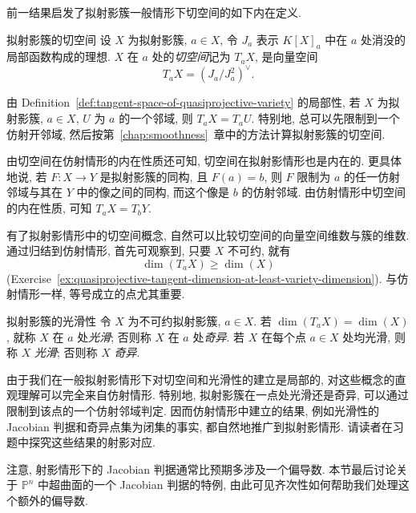 前一结果启发了拟射影簇一般情形下切空间的如下内在定义.

\begin{Definition}{拟射影簇的切空间}\leavevmode\label{def:tangent-space-of-quasiprojective-variety}
设 $X$ 为拟射影簇, $a\in X$, 令 $J_{a}$ 表示 $K[X]_{a}$ 中在 $a$ 处消没的局部函数构成的理想. $X$ 在 $a$ 处的\emph{切空间}记为 $T_{a}X$, 是向量空间
\[
  T_{a}X=(J_{a}/J_{a}^{2})^{\vee}.
\]
\end{Definition}

由 Definition~\ref{def:tangent-space-of-quasiprojective-variety} 的局部性, 若 $X$ 为拟射影簇, $a\in X$, $U$ 为 $a$ 的一个邻域, 则 $T_{a}X=T_{a}U$. 特别地, 总可以先限制到一个仿射开邻域, 然后按第~\ref{chap:smoothness}~章中的方法计算拟射影簇的切空间.

由切空间在仿射情形的内在性质还可知, 切空间在拟射影情形也是内在的. 更具体地说, 若 $F:X\to Y$ 是拟射影簇的同构, 且 $F(a)=b$, 则 $F$ 限制为 $a$ 的任一仿射邻域与其在 $Y$ 中的像之间的同构, 而这个像是 $b$ 的仿射邻域. 由仿射情形中切空间的内在性质, 可知 $T_{a}X=T_{b}Y$.

有了拟射影情形中的切空间概念, 自然可以比较切空间的向量空间维数与簇的维数. 通过归结到仿射情形, 首先可观察到, 只要 $X$ 不可约, 就有
\[
  \dim(T_{a}X)\ge\dim(X)
\]
(Exercise~\ref{ex:quasiprojective-tangent-dimension-at-least-variety-dimension}). 与仿射情形一样, 等号成立的点尤其重要.

\begin{Definition}{拟射影簇的光滑性}\leavevmode\label{def:smoothness-of-quasiprojective-variety}
令 $X$ 为不可约拟射影簇, $a\in X$. 若 $\dim(T_{a}X)=\dim(X)$, 就称 $X$ 在 $a$ 处\emph{光滑}; 否则称 $X$ 在 $a$ 处\emph{奇异}. 若 $X$ 在每个点 $a\in X$ 处均光滑, 则称 $X$ \emph{光滑}; 否则称 $X$ \emph{奇异}.
\end{Definition}

由于我们在一般拟射影情形下对切空间和光滑性的建立是局部的, 对这些概念的直观理解可以完全来自仿射情形. 特别地, 拟射影簇在一点处光滑还是奇异, 可以通过限制到该点的一个仿射邻域判定. 因而仿射情形中建立的结果, 例如光滑性的 Jacobian 判据和奇异点集为闭集的事实, 都自然地推广到拟射影情形. 请读者在习题中探究这些结果的射影对应.

注意, 射影情形下的 Jacobian 判据通常比预期多涉及一个偏导数. 本节最后讨论关于 $\mathbb{P}^{n}$ 中超曲面的一个 Jacobian 判据的特例, 由此可见齐次性如何帮助我们处理这个额外的偏导数.

